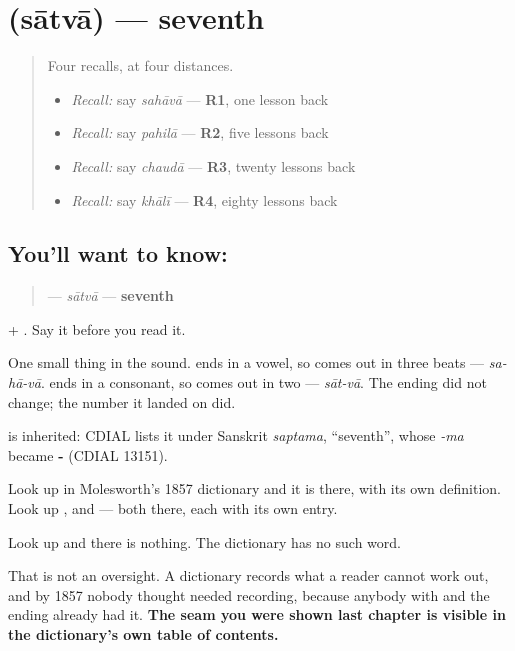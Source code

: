 \section[\texorpdfstring{\mr{सातवा} (sātvā)}{सातवा (sātvā)}]{ (sātvā) — seventh}

\label{lesson:MR-C61-satva}



\begin{quote}
Four recalls, at four distances.

\begin{itemize}
\raggedright
  \item \emph{Recall:} say \emph{sahāvā} — \textbf{R1}, one lesson back
  \item \emph{Recall:} say \emph{pahilā} — \textbf{R2}, five lessons back
  \item \emph{Recall:} say \emph{chaudā} — \textbf{R3}, twenty lessons back
  \item \emph{Recall:} say \emph{khālī} — \textbf{R4}, eighty lessons back
\end{itemize}
\end{quote}

\subsection*{You'll want to know: }
\begin{quote}
\textbf{} — \emph{sātvā} — \textbf{seventh}
\end{quote}

\textbf{} + \textbf{}. Say it before you read it.

One small thing in the sound. \textbf{} ends in a vowel, so \textbf{} comes out in three beats — \emph{sa-hā-vā}. \textbf{} ends in a consonant, so \textbf{} comes out in two — \emph{sāt-vā}. The ending did not change; the number it landed on did.

\begin{cousinweb}
\textbf{} is inherited: CDIAL lists it under Sanskrit \emph{saptama}, \textquotedblleft{}seventh\textquotedblright{}, whose \emph{-ma} became \textbf{-} (CDIAL 13151).
\end{cousinweb}

\begin{grammarlens}[title={Grammar Lens: Molesworth agrees with you}]
Look up \textbf{} in Molesworth's 1857 dictionary and it is there, with its own definition. Look up \textbf{}, and \textbf{} — both there, each with its own entry.

Look up \textbf{} and there is nothing. The dictionary has no such word.

That is not an oversight. A dictionary records what a reader cannot work out, and by 1857 nobody thought \textbf{} needed recording, because anybody with \textbf{} and the ending already had it. \textbf{The seam you were shown last chapter is visible in the dictionary's own table of contents.}
\end{grammarlens}

